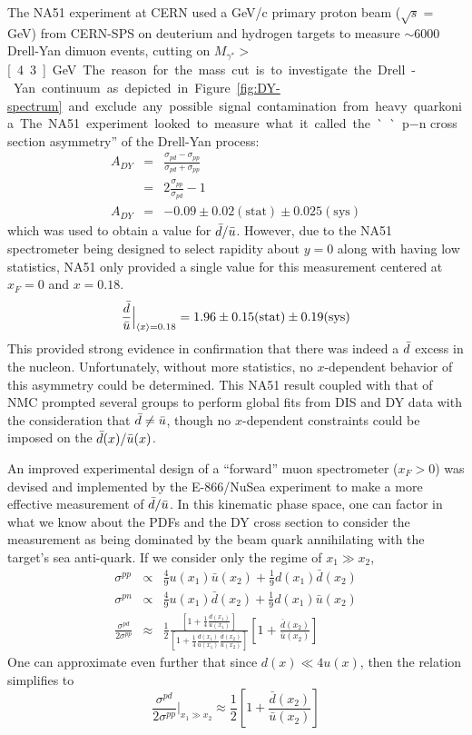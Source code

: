 The NA51 experiment at CERN\cite{Baldit:1994jk} used a \unit[450]{GeV/c} primary proton beam ($\sqrt{s}=$\unit[29]{GeV}) from CERN-SPS on deuterium and hydrogen targets to measure $\sim$6000 Drell-Yan dimuon events, cutting on $M_{\gamma^*}>$\unit[4.3]{GeV}. The reason for the mass cut is to investigate the Drell-Yan continuum as depicted in Figure~\ref{fig:DY-spectrum} and exclude any possible signal contamination from heavy quarkonia. The NA51 experiment looked to measure what it called the ``p$-$n cross section asymmetry'' of the Drell-Yan process:
\begin{eqnarray}
A_{DY} & = & \frac{\sigma_{pd}-\sigma_{pp}}{\sigma_{pd}+\sigma_{pp}} \\
& = & 2\frac{\sigma_{pp}}{\sigma_{pd}} - 1 \\
A_{DY} & = &  -0.09 \pm 0.02 (\text{stat}) \pm 0.025 (\text{sys})
\end{eqnarray}
which was used to obtain a value for $\bar{d}/\bar{u}$. However, due to the NA51 spectrometer being designed to select rapidity about $y=0$ along with having low statistics, NA51 only provided a single value for this measurement centered at $x_F=0$ and $x=0.18$.
\begin{equation}
	\frac{\bar{d}}{\bar{u}} \Bigr|_{\langle x \rangle = 0.18} = 1.96 \pm 0.15\text{(stat)} \pm 0.19\text{(sys)}
\end{equation}
This provided strong evidence in confirmation that there was indeed a $\bar{d}$ excess in the nucleon. Unfortunately, without more statistics, no $x$-dependent behavior of this asymmetry could be determined. This NA51 result coupled with that of NMC prompted several groups to perform global fits from DIS and DY data with the consideration that $\bar{d}\neq\bar{u}$, though no $x$-dependent constraints could be imposed on the $\bar{d}(x)/\bar{u}(x)$.

An improved experimental design of a ``forward'' muon spectrometer ($x_F>0$) was devised and implemented by the E-866/NuSea experiment to make a more effective measurement of $\bar{d}/\bar{u}$. In this kinematic phase space, one can factor in what we know about the PDFs and the DY cross section to consider the measurement as being dominated by the beam quark annihilating with the target's sea anti-quark. If we consider only the regime of $x_1 \gg x_2$,
\begin{eqnarray}
\sigma^{pp} & \propto & \frac{4}{9} u(x_1)\bar{u}(x_2) + \frac{1}{9}d(x_1)\bar{d}(x_2) \\
\sigma^{pn} & \propto & \frac{4}{9} u(x_1)\bar{d}(x_2) + \frac{1}{9}d(x_1)\bar{u}(x_2) \\
\frac{\sigma^{pd}}{2\sigma^{pp}} & \approx & \frac{1}{2} \frac{\left[1 + \frac{1}{4} \frac{d(x_1)}{u(x_1)}\right]}{\left[1 + \frac{1}{4} \frac{d(x_1)}{u(x_1)}\frac{\bar{d}(x_2)}{\bar{u}(x_2)}\right]} \left[1 + \frac{\bar{d}(x_2)}{\bar{u}(x_2)}\right]
\end{eqnarray}
One can approximate even further that since $d(x) \ll 4 u(x)$, then the relation simplifies to
\begin{equation}
\frac{\sigma^{pd}}{2\sigma^{pp}}\Bigr|_{x_1\gg x_2} \approx
\frac{1}{2} \left[1 + \frac{\bar{d}(x_2)}{\bar{u}(x_2)}\right]
\label{eq:866-dbar-ubar}
\end{equation}

